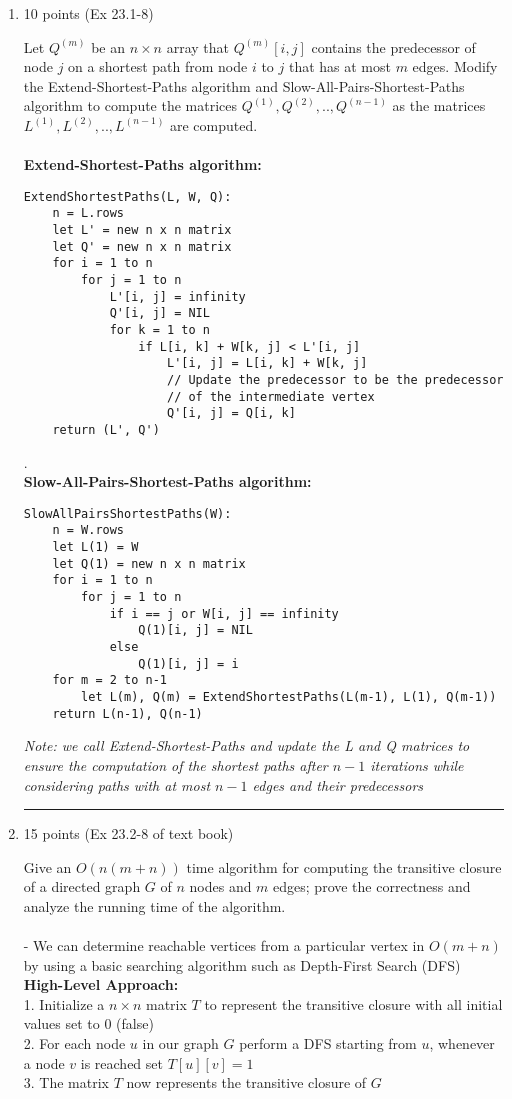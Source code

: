 \documentclass[letterpaper,12pt]{article}
\begin{document}
\begin{enumerate}
\noindent\rule{16cm}{0.1pt}
\item 10 points (Ex 23.1-8)

Let $Q^{(m)}$ be an $n\times n$ array that $Q^{(m)}[i,j]$ contains the
predecessor of node $j$ on a shortest path from node $i$ to $j$ that has at most
$m$ edges. Modify the Extend-Shortest-Paths algorithm and
Slow-All-Pairs-Shortest-Paths algorithm to compute the matrices
$Q^{(1)},Q^{(2)},..,Q^{(n-1)}$ as the matrices $L^{(1)},L^{(2)},..,L^{(n-1)}$
are computed. \\ \\
\textbf{Extend-Shortest-Paths algorithm:}
\begin{verbatim}
ExtendShortestPaths(L, W, Q):
    n = L.rows
    let L' = new n x n matrix
    let Q' = new n x n matrix
    for i = 1 to n
        for j = 1 to n
            L'[i, j] = infinity
            Q'[i, j] = NIL
            for k = 1 to n
                if L[i, k] + W[k, j] < L'[i, j]
                    L'[i, j] = L[i, k] + W[k, j]
                    // Update the predecessor to be the predecessor 
                    // of the intermediate vertex
                    Q'[i, j] = Q[i, k]  
    return (L', Q')
\end{verbatim} 

. \\

\textbf{Slow-All-Pairs-Shortest-Paths algorithm:}
\begin{verbatim}
SlowAllPairsShortestPaths(W):
    n = W.rows
    let L(1) = W
    let Q(1) = new n x n matrix
    for i = 1 to n
        for j = 1 to n
            if i == j or W[i, j] == infinity
                Q(1)[i, j] = NIL
            else
                Q(1)[i, j] = i
    for m = 2 to n-1
        let L(m), Q(m) = ExtendShortestPaths(L(m-1), L(1), Q(m-1))
    return L(n-1), Q(n-1)
\end{verbatim}
\textit{Note: we call Extend-Shortest-Paths and update the L and Q matrices to ensure the computation of the shortest paths after $n-1$ iterations while considering paths with at most $n-1$ edges and their predecessors}

\noindent\rule{16cm}{0.1pt}
\item 15 points (Ex 23.2-8 of text book)

Give an $O(n(m+n))$ time algorithm for computing the transitive closure of a directed
graph $G$ of $n$ nodes and $m$ edges; prove the correctness and analyze the running
time of the algorithm. \\ \\
- We can determine reachable vertices from a particular vertex in $O(m+n)$ by using a basic searching algorithm such as Depth-First Search (DFS) \\
\textbf{High-Level Approach:} \\
1. Initialize a $n \times n$ matrix $T$ to represent the transitive closure with all initial values set to 0 (false) \\
2. For each node $u$ in our graph $G$ perform a DFS starting from $u$, whenever a node $v$ is reached set $T[u][v]=1$ \\
3. The matrix $T$ now represents the transitive closure of $G$ \\


\end{enumerate}
\end{document}
